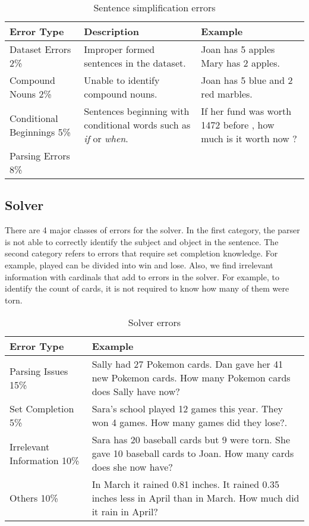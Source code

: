 \documentclass[11pt]{article}
\begin{document}
\begin{table}[h!]
\centering
\begin{tabular}{|m{2cm}|m{2cm}|m{2cm}|}
\hline
\textbf{Error Type} & \textbf{Description} & \textbf{Example}  \\ \hline
Dataset Errors 2\% & Improper formed sentences in the dataset. & Joan has 5 apples Mary has 2 apples. \\ \hline
Compound Nouns 2\% & Unable to identify compound nouns. & Joan has 5 blue and 2 red marbles. \\ \hline
Conditional Beginnings 5\% & Sentences beginning with conditional words such as \textit{if} or \textit{when}. & If her fund was worth 1472 before , how much is it worth now ? \\ \hline
Parsing Errors 8\% &  & \\ \hline
\end{tabular}
\caption{Sentence simplification errors}
\label{figure:15}
\end{table}

\subsection{Solver}
There are 4 major classes of errors for the solver. In the first category, the parser is not able to correctly identify the subject and object in the sentence. The second category refers to errors that require set completion knowledge. For example, played can be divided into win and lose. Also, we find irrelevant information with cardinals that add to errors in the solver. For example, to identify the count of cards, it is not required to know how many of them were torn.
\begin{table}[h!]
\centering
\begin{tabular}{|m{2cm}|m{4 cm}|}
\hline
 \textbf{Error Type} & \textbf{Example}\\ \hline
Parsing Issues 15\% & Sally had 27 Pokemon cards. Dan gave her 41 new Pokemon cards. How many Pokemon cards does Sally have now? \\ \hline
Set Completion 5\% & Sara’s school played 12 games this year. They won 4 games. How many games did they lose?. \\ \hline
Irrelevant Information 10\% & Sara has 20 baseball cards but 9 were torn. She gave 10 baseball cards to Joan. How many cards does she now have? \\ \hline
Others 10\% & In March it rained 0.81 inches. It rained 0.35 inches less in April than in March. How much did it rain in April?  \\ \hline
\end{tabular}
\caption{Solver errors}
\label{figure:16}
\end{table}
\end{document}

